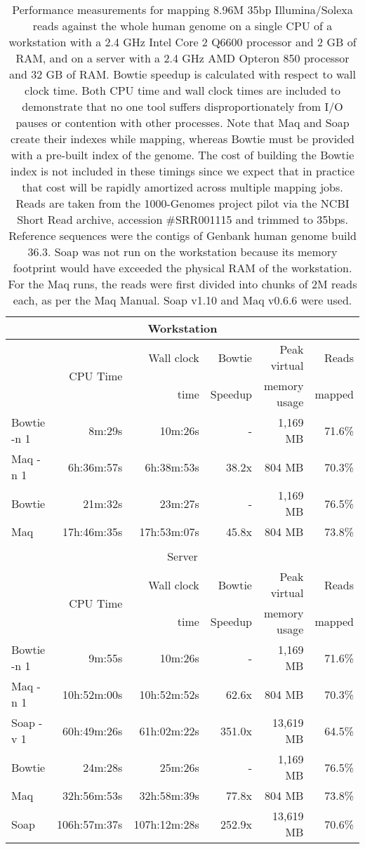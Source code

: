 \documentclass[letterpaper]{article}
\begin{document}
\begin{table}[tp]
\scriptsize
\begin{tabular}{lrrrrr}
\multicolumn{6}{c}{\small{Workstation}} \\[3pt]
\toprule
 & \multirow{2}{*}{CPU Time} & Wall clock & Bowtie  & Peak virtual & Reads  \\
 &                            & time       & Speedup & memory usage & mapped \\[3pt]
\toprule
Bowtie -n 1 & 8m:29s & 10m:26s & - & 1,169 MB & 71.6\%\\\midrule
Maq -n 1 & 6h:36m:57s & 6h:38m:53s & 38.2x & 804 MB & 70.3\%\\\midrule
\midrule
Bowtie & 21m:32s & 23m:27s & - & 1,169 MB & 76.5\%\\\midrule
Maq & 17h:46m:35s & 17h:53m:07s & 45.8x & 804 MB & 73.8\%\\
\toprule\\[1pt]
\multicolumn{6}{c}{\small{Server}} \\[3pt]
\toprule
 & \multirow{2}{*}{CPU Time} & Wall clock & Bowtie  & Peak virtual & Reads  \\
 &                            & time       & Speedup & memory usage & mapped \\[3pt]
\toprule
Bowtie -n 1 & 9m:55s & 10m:26s & - & 1,169 MB & 71.6\%\\\midrule
Maq -n 1 & 10h:52m:00s & 10h:52m:52s & 62.6x & 804 MB & 70.3\%\\\midrule
Soap -v 1 & 60h:49m:26s & 61h:02m:22s & 351.0x & 13,619 MB & 64.5\%\\\midrule
\midrule
Bowtie & 24m:28s & 25m:26s & - & 1,169 MB & 76.5\%\\\midrule
Maq & 32h:56m:53s & 32h:58m:39s & 77.8x & 804 MB & 73.8\%\\\midrule
Soap & 106h:57m:37s & 107h:12m:28s & 252.9x & 13,619 MB & 70.6\%\\
\bottomrule
\end{tabular}
\caption{Performance measurements for mapping 8.96M 35bp Illumina/Solexa reads
against the whole human genome on a single CPU of a workstation with a 2.4 GHz
Intel Core 2 Q6600 processor and 2 GB of RAM, and on a server with a 2.4 GHz
AMD Opteron 850 processor and 32 GB of RAM. Bowtie speedup is calculated with
respect to wall clock time. Both CPU time and wall clock times are included to
demonstrate that no one tool suffers disproportionately from I/O pauses or
contention with other processes. Note that Maq and Soap create their indexes
while mapping, whereas Bowtie must be provided with a pre-built index of the
genome.  The cost of building the Bowtie index is not included in these timings
since we expect that in practice that cost will be rapidly amortized across
multiple mapping jobs. Reads are taken from the 1000-Genomes project pilot via
the NCBI Short Read archive, accession \#SRR001115 and trimmed to 35bps.
Reference sequences were the contigs of Genbank human genome build 36.3. Soap
was not run on the workstation because its memory footprint would have exceeded
the physical RAM of the workstation. For the Maq runs, the reads were first
divided into chunks of 2M reads each, as per the Maq Manual. Soap v1.10 and Maq
v0.6.6 were used. }
\end{table}
\end{document}

